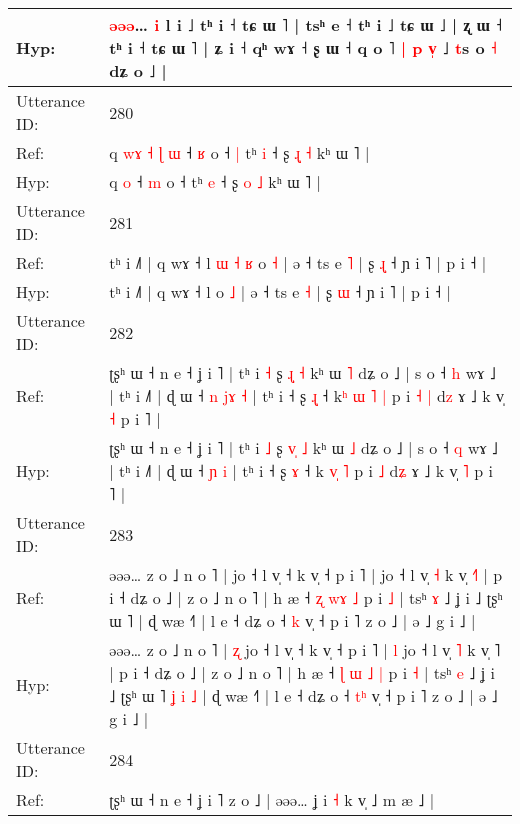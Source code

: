 \documentclass[10pt]{article}
\DeclareRobustCommand{\hl}[1]{{\textcolor{red}{#1}}}
\begin{document}
\begin{longtable}{ll}
Hyp: & \hl{ə}\hl{ə}\hl{ə}… \hl{i} l i ˩ tʰ i ˧ tɕ ɯ ˥ | tsʰ e ˧ tʰ i ˩ tɕ ɯ ˩ | ʐ ɯ ˧ tʰ i ˧ tɕ ɯ ˥ | ʑ i ˧ qʰ wɤ ˧ ʂ ɯ ˧ q o ˥\hl{ }\hl{|} \hl{p} \hl{v}\hl{̩} ˩ \hl{t}s o \hl{˧} dʑ o ˩ |
 \\
\midrule
Utterance ID: & 280 \\
Ref: & q\hl{ }\hl{w}\hl{ɤ}\hl{ }\hl{˧}\hl{ }\hl{ɭ} \hl{ɯ} ˧ \hl{ʁ} o ˧\hl{ }\hl{|} tʰ \hl{i} ˧ ʂ \hl{ɻ}\hl{̩} \hl{˧} kʰ ɯ ˥ |
 \\
Hyp: & q\hl{}\hl{}\hl{}\hl{}\hl{}\hl{}\hl{} \hl{o} ˧ \hl{m} o ˧\hl{}\hl{} tʰ \hl{e} ˧ ʂ \hl{}\hl{o} \hl{˩} kʰ ɯ ˥ |
 \\
\midrule
Utterance ID: & 281 \\
Ref: & tʰ i ˩˥ | q wɤ ˧ l\hl{ }\hl{ɯ}\hl{ }\hl{˧}\hl{ }\hl{ʁ} o \hl{˧} | ə ˧ ts e \hl{˥} | ʂ \hl{ɻ}\hl{̩} ˧ ɲ i ˥ | p i ˧ |
 \\
Hyp: & tʰ i ˩˥ | q wɤ ˧ l\hl{}\hl{}\hl{}\hl{}\hl{}\hl{} o \hl{˩} | ə ˧ ts e \hl{˧} | ʂ \hl{}\hl{ɯ} ˧ ɲ i ˥ | p i ˧ |
 \\
\midrule
Utterance ID: & 282 \\
Ref: & ʈʂʰ ɯ ˧ n e ˧ ʝ i ˥ | tʰ i \hl{˧} ʂ \hl{ɻ}̩ \hl{˧} kʰ ɯ \hl{˥} dʑ o ˩ | s o ˧ \hl{h} wɤ ˩ | tʰ i ˩˥ | ɖ ɯ ˧\hl{ }\hl{n} \hl{j}\hl{ɤ} \hl{˧} | tʰ i ˧ ʂ \hl{ɻ}\hl{̩} ˧ k\hl{ʰ} \hl{ɯ}\hl{ }\hl{˥} \hl{|} p i\hl{ }\hl{˧} \hl{|} d\hl{z} ɤ ˩ k v̩ \hl{˧} p i ˥ |
 \\
Hyp: & ʈʂʰ ɯ ˧ n e ˧ ʝ i ˥ | tʰ i \hl{˩} ʂ \hl{v}̩ \hl{˩} kʰ ɯ \hl{˩} dʑ o ˩ | s o ˧ \hl{q} wɤ ˩ | tʰ i ˩˥ | ɖ ɯ ˧\hl{}\hl{} \hl{}\hl{ɲ} \hl{i} | tʰ i ˧ ʂ \hl{}\hl{ɤ} ˧ k\hl{} \hl{}\hl{v}\hl{̩} \hl{˥} p i\hl{}\hl{} \hl{˩} d\hl{ʑ} ɤ ˩ k v̩ \hl{˥} p i ˥ |
 \\
\midrule
Utterance ID: & 283 \\
Ref: & əəə… z o ˩ n o ˥ |\hl{}\hl{} jo ˧ l v̩ ˧ k v̩ ˧ p i ˥ |\hl{}\hl{} jo ˧ l v̩ \hl{˧} k v̩ \hl{˧}˥ | p i ˧ dʑ o ˩ | z o ˩ n o ˥ | h æ ˧ \hl{ʐ} \hl{}\hl{w}\hl{ɤ} \hl{˩} p i \hl{˩} | tsʰ \hl{ɤ} ˩ ʝ i ˩ ʈʂʰ ɯ ˥\hl{}\hl{}\hl{}\hl{}\hl{}\hl{} | ɖ wæ ˧˥ | l e ˧ dʑ o ˧ \hl{}\hl{k} v̩ ˧ p i ˥ z o ˩ | ə ˩ g i ˩ |
 \\
Hyp: & əəə… z o ˩ n o ˥ |\hl{ }\hl{ʐ} jo ˧ l v̩ ˧ k v̩ ˧ p i ˥ |\hl{ }\hl{l} jo ˧ l v̩ \hl{˥} k v̩ \hl{}˥ | p i ˧ dʑ o ˩ | z o ˩ n o ˥ | h æ ˧ \hl{ɭ} \hl{ɯ}\hl{ }\hl{˩} \hl{|} p i \hl{˧} | tsʰ \hl{e} ˩ ʝ i ˩ ʈʂʰ ɯ ˥\hl{ }\hl{ʝ}\hl{ }\hl{i}\hl{ }\hl{˩} | ɖ wæ ˧˥ | l e ˧ dʑ o ˧ \hl{t}\hl{ʰ} v̩ ˧ p i ˥ z o ˩ | ə ˩ g i ˩ |
 \\
\midrule
Utterance ID: & 284 \\
Ref: & ʈʂʰ ɯ ˧ n e ˧ ʝ i ˥\hl{}\hl{} z o ˩ | əəə… ʝ i \hl{˧} k v̩ ˩ m æ ˩ |

\end{longtable}
\end{document}
